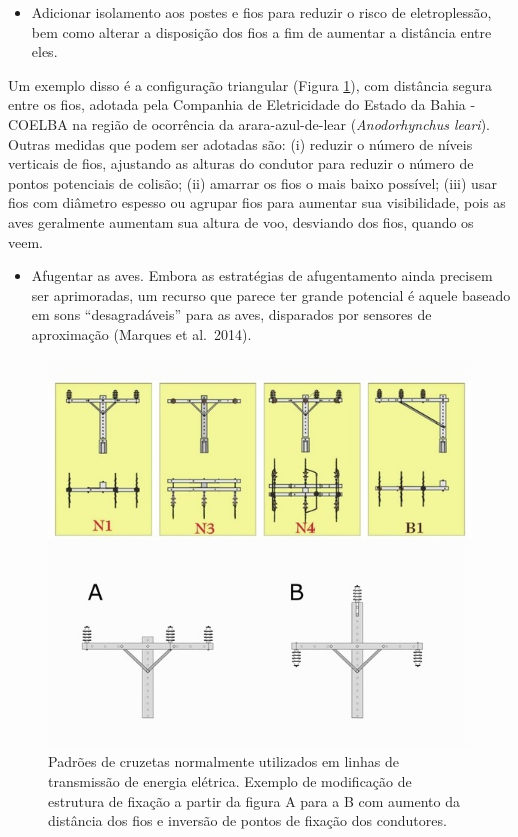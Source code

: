 \documentclass[
  oneside]{scrbook}
\providecommand{\tightlist}{%
  \setlength{\itemsep}{0pt}\setlength{\parskip}{0pt}}
\begin{document}
\begin{itemize}
\tightlist
\item
  Adicionar isolamento aos postes e fios para reduzir o risco de eletroplessão, bem como alterar a disposição dos fios a fim de aumentar a distância entre eles.
\end{itemize}

Um exemplo disso é a configuração triangular (Figura \ref{fig:17}), com distância segura entre os fios, adotada pela Companhia de Eletricidade do Estado da Bahia - COELBA na região de ocorrência da arara-azul-de-lear (\emph{Anodorhynchus leari}). Outras medidas que podem ser adotadas são: (i) reduzir o número de níveis verticais de fios, ajustando as alturas do condutor para reduzir o número de pontos potenciais de colisão; (ii) amarrar os fios o mais baixo possível; (iii) usar fios com diâmetro espesso ou agrupar fios para aumentar sua visibilidade, pois as aves geralmente aumentam sua altura de voo, desviando dos fios, quando os veem.

\begin{itemize}
\tightlist
\item
  Afugentar as aves. Embora as estratégias de afugentamento ainda precisem ser aprimoradas, um recurso que parece ter grande potencial é aquele baseado em sons ``desagradáveis'' para as aves, disparados por sensores de aproximação (Marques et al.~2014).
\end{itemize}

\begin{figure}[H]

{\centering \includegraphics[width=0.75\linewidth]{imagens/cap05/Figura_5.2} 

}

\caption{Padrões de cruzetas normalmente utilizados em linhas de transmissão de energia elétrica. Exemplo de modificação de estrutura de fixação a partir da figura A para a B com aumento da distância dos fios e inversão de pontos de fixação dos condutores.}\label{fig:17}
\end{figure}
\end{document}
